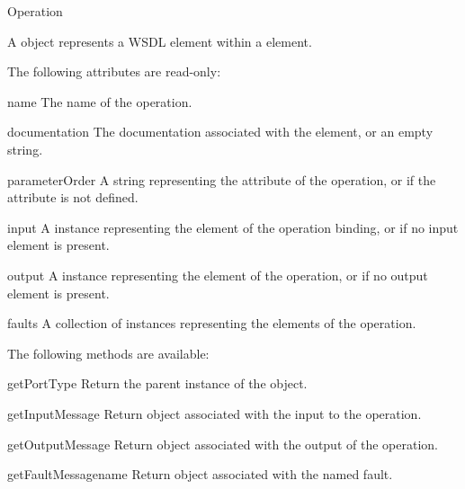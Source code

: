 \begin{classdesc}{Operation}{}

A  object represents a WSDL  element 
within a  element.

The following attributes are read-only:

\begin{memberdesc}{name}
The name of the operation.
\end{memberdesc}

\begin{memberdesc}{documentation}
The documentation associated with the element, or an empty string.
\end{memberdesc}

\begin{memberdesc}{parameterOrder}
A string representing the  attribute of the operation, 
or  if the attribute is not defined.
\end{memberdesc}

\begin{memberdesc}{input}
A  instance representing the  element of 
the operation binding, or  if no input element is present.
\end{memberdesc}

\begin{memberdesc}{output}
A  instance representing the  element of 
the operation, or  if no output element is present.
\end{memberdesc}

\begin{memberdesc}{faults}
A collection of  instances representing the  
elements of the operation.
\end{memberdesc}

The following methods are available:

\begin{methoddesc}{getPortType}{}
Return the parent  instance of the object.
\end{methoddesc}

\begin{methoddesc}{getInputMessage}{}
Return  object associated with the input to the operation.
\end{methoddesc}

\begin{methoddesc}{getOutputMessage}{}
Return  object associated with the output of the operation.
\end{methoddesc}

\begin{methoddesc}{getFaultMessage}{name}
Return  object associated with the named fault.
\end{methoddesc}

\end{classdesc}

